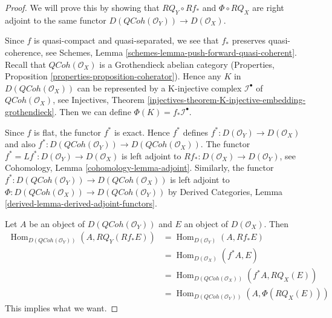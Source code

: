 \documentclass{stacks-project}
\theoremstyle{plain}
\theoremstyle{definition}
\theoremstyle{remark}
\numberwithin{equation}{subsection}
\def\Hom{\mathop{\mathrm{Hom}}\nolimits}
\def\QCoh{\mathit{QCoh}}
\begin{document}
\begin{proof}
We will prove this by showing that $RQ_Y \circ Rf_*$ and $\Phi \circ RQ_X$
are right adjoint to the same functor
$D(\QCoh(\mathcal{O}_Y)) \to D(\mathcal{O}_X)$.

\medskip\noindent
Since $f$ is quasi-compact and quasi-separated, we see that
$f_*$ preserves quasi-coherence, see
Schemes, Lemma \ref{schemes-lemma-push-forward-quasi-coherent}.
Recall that $\QCoh(\mathcal{O}_X)$ is a Grothendieck abelian category
(Properties, Proposition \ref{properties-proposition-coherator}).
Hence any $K$ in $D(\QCoh(\mathcal{O}_X))$
can be represented by a K-injective complex $\mathcal{I}^\bullet$
of $\QCoh(\mathcal{O}_X)$, see
Injectives, Theorem
\ref{injectives-theorem-K-injective-embedding-grothendieck}.
Then we can define $\Phi(K) = f_*\mathcal{I}^\bullet$.

\medskip\noindent
Since $f$ is flat, the functor $f^*$ is exact. Hence $f^*$ defines
$f^* : D(\mathcal{O}_Y) \to D(\mathcal{O}_X)$ and also
$f^* : D(\QCoh(\mathcal{O}_Y)) \to D(\QCoh(\mathcal{O}_X))$.
The functor $f^* = Lf^* : D(\mathcal{O}_Y) \to D(\mathcal{O}_X)$
is left adjoint to
$Rf_* : D(\mathcal{O}_X) \to D(\mathcal{O}_Y)$,
see Cohomology, Lemma \ref{cohomology-lemma-adjoint}.
Similarly, the functor
$f^* : D(\QCoh(\mathcal{O}_Y)) \to D(\QCoh(\mathcal{O}_X))$
is left adjoint to
$\Phi : D(\QCoh(\mathcal{O}_X)) \to D(\QCoh(\mathcal{O}_Y))$
by Derived Categories, Lemma \ref{derived-lemma-derived-adjoint-functors}.

\medskip\noindent
Let $A$ be an object of $D(\QCoh(\mathcal{O}_Y))$ and
$E$ an object of $D(\mathcal{O}_X)$. Then
\begin{align*}
\Hom_{D(\QCoh(\mathcal{O}_Y))}(A, RQ_Y(Rf_*E))
& =
\Hom_{D(\mathcal{O}_Y)}(A, Rf_*E) \\
& =
\Hom_{D(\mathcal{O}_X)}(f^*A, E) \\
& =
\Hom_{D(\QCoh(\mathcal{O}_X))}(f^*A, RQ_X(E)) \\
& =
\Hom_{D(\QCoh(\mathcal{O}_Y))}(A, \Phi(RQ_X(E)))
\end{align*}
This implies what we want.
\end{proof}
\end{document}
